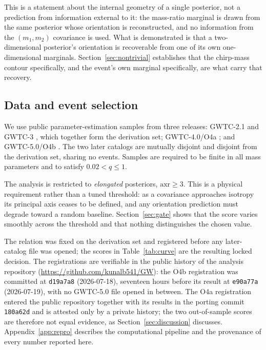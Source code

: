 \documentclass[aps,preprint,amsmath,amssymb,nofootinbib,superscriptaddress]{revtex4-2}
\begin{document}
This is a statement about the internal geometry of a single posterior, not a prediction from information
external to it: the mass-ratio marginal is drawn from the same posterior whose orientation is
reconstructed, and no information from the $(m_1,m_2)$ covariance is used. What is demonstrated is that a
two-dimensional posterior's orientation is recoverable from one of its own one-dimensional marginals.
Section~\ref{sec:nontrivial} establishes that the chirp-mass contour specifically, and the event's own
marginal specifically, are what carry that recovery.

\subsection{Data and event selection}
\label{sec:data}
We use public parameter-estimation samples from three releases: GWTC-2.1 \citep{GWTC21} and GWTC-3
\citep{GWTC3}, which together form the derivation set; GWTC-4.0/O4a \citep{GWTC4}; and GWTC-5.0/O4b
\citep{GWTC5}. The two later catalogs are mutually disjoint and disjoint from the derivation set, sharing
no events. Samples are required to be finite in all mass parameters and to satisfy $0.02 < q \le 1$.

The analysis is restricted to \emph{elongated} posteriors, $\mathrm{axr}\ge 3$. This is a physical
requirement rather than a tuned threshold: as a covariance approaches isotropy its principal axis ceases to
be defined, and any orientation prediction must degrade toward a random baseline. Section~\ref{sec:gate}
shows that the score varies smoothly across the threshold and that nothing distinguishes the chosen value.

The relation was fixed on the derivation set and registered before any later-catalog file was opened; the
scores in Table~\ref{tab:curve} are the resulting locked decision. The registrations are verifiable in
the public history of the analysis repository (\url{https://github.com/kunalb541/GW}): the O4b
registration was committed at \texttt{d19a7a8} (2026-07-18), seventeen hours before its result at
\texttt{e90a77a} (2026-07-19), with no GWTC-5.0 file opened in between. The O4a registration entered the
public repository together with its results in the porting commit \texttt{180a62d} and is attested only
by a private history; the two out-of-sample scores are therefore not equal evidence, as
Section~\ref{sec:discussion} discusses. Appendix~\ref{app:repro} describes the
computational pipeline and the provenance of every number reported here.
\end{document}
